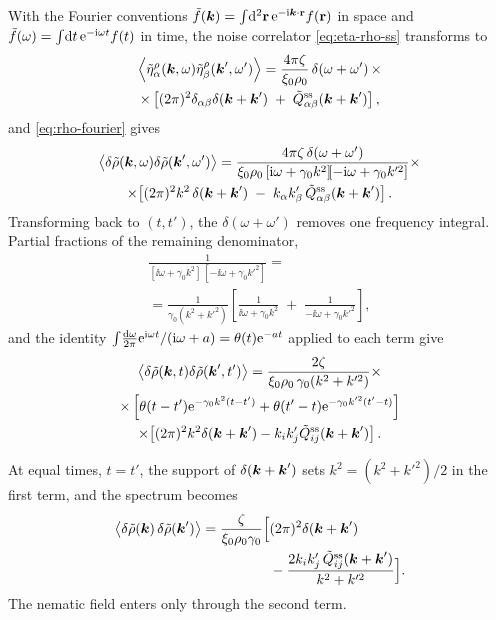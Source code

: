 \documentclass[aps,pre,reprint,superscriptaddress,longbibliography,nofootinbib
]{revtex4-2}
\begin{document}
With the Fourier conventions $\tilde
f(\boldsymbol{k})=\int\!\mathrm{d}^2\mathbf{r}\,\mathrm{e}^{-\mathrm{i}\boldsymbol{k}\cdot\mathbf{r}}f(\mathbf{r})$ in space and
$\tilde f(\omega)=\int\!\mathrm{d} t\,\mathrm{e}^{-\mathrm{i}\omega t}f(t)$ in
time, the noise correlator \cref{eq:eta-rho-ss} transforms
to
\begin{multline}
  \left\langle\tilde \eta^\rho_\alpha(\boldsymbol{k},\omega)\tilde \eta^\rho_\beta(\boldsymbol{k}',\omega')\right\rangle = \frac{4\pi\zeta}{\xi_0\rho_0}\,\delta(\omega+\omega')\,\times
  \\
  \times
  \left[(2\pi)^2 \delta_{\alpha\beta} \delta(\boldsymbol{k}+\boldsymbol{k}')\;+\;\tilde Q^{\mathrm{ss}}_{\alpha\beta}(\boldsymbol{k}+\boldsymbol{k}')\right],
\end{multline}
and \cref{eq:rho-fourier} gives
\begin{multline}
  \left\langle\delta\tilde\rho(\boldsymbol{k},\omega)\delta\tilde\rho(\boldsymbol{k}',\omega') \right\rangle= \frac{4\pi\zeta\,\delta(\omega+\omega')}{\xi_0\rho_0\,[\mathrm{i}\omega+\gamma_0 k^2]\![-\mathrm{i}\omega+\gamma_0 k'^2]}\times
  \\
  \times
  \!\left[(2\pi)^2 k^2\,\delta(\boldsymbol{k}+\boldsymbol{k}')\;-\;k_\alpha k'_\beta\,\tilde Q^{\mathrm{ss}}_{\alpha\beta}(\boldsymbol{k}+\boldsymbol{k}')\right].
\end{multline}
Transforming back to $(t,t')$, the $\delta(\omega+\omega')$
removes one frequency integral. Partial fractions of the
remaining denominator,
\begin{multline}
    \frac{1}{[\ii\omega+\gamma_0 k^2]\,[-\ii\omega+\gamma_0 k'^2]} = 
    \\
    =\frac{1}{\gamma_0(k^2+k'^2)}\!\left[\frac{1}{\ii\omega+\gamma_0 k^2}\;+\;\frac{1}{-\ii\omega+\gamma_0 k'^2}\right],
\end{multline}
and the identity $\int\!\frac{\mathrm{d}\omega}{2\pi}\mathrm{e}^{\mathrm{i}\omega
t}/(\mathrm{i}\omega+a) = \theta(t)\mathrm{e}^{-at}$ applied to each term
give
\begin{multline}
  \label{eq:rho-autocorrelation-isotropic-without-elln}
  \left\langle\delta\tilde\rho(\boldsymbol{k},t)\delta\tilde\rho(\boldsymbol{k}',t')\right\rangle = \frac{2\zeta}{\xi_0\rho_0\,\gamma_0(k^2+k'^2)}\times
  \\
  \times \left[\theta(t-t')\mathrm{e}^{-\gamma_0 k^2(t-t')}+\theta(t'-t)\mathrm{e}^{-\gamma_0 k'^2(t'-t)}\right]
  \\
  \times\!\left[(2\pi)^2 k^2\delta(\boldsymbol{k}+\boldsymbol{k}') - k_ik'_j\tilde{Q}^{\mathrm{ss}}_{ij}(\boldsymbol{k}+\boldsymbol{k}')\right].
\end{multline}

At equal times, $t=t'$, the support of $\delta(\boldsymbol{k}+\boldsymbol{k}')$
sets $k^2=(k^2+k'^2)/2$ in the first term, and the spectrum
becomes
\begin{align}
  \label{eq:rho-spectrum}
  \left\langle\delta\tilde\rho(\boldsymbol{k})\,\delta\tilde\rho(\boldsymbol{k}')\right\rangle
  = \frac{\zeta}{\xi_0\rho_0\gamma_0}\Bigl[{}&(2\pi)^2\delta(\boldsymbol{k}+\boldsymbol{k}')
  \nonumber\\
  &-\frac{2k_ik'_j\,\tilde Q^{\mathrm{ss}}_{ij}(\boldsymbol{k}+\boldsymbol{k}')}{k^2+k'^2}\Bigr].
\end{align}
The nematic field enters only through the second term.
\end{document}
